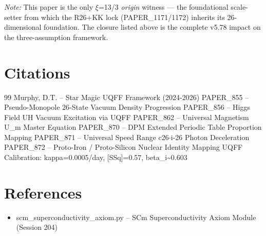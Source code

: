 \documentclass[12pt,a4paper]{article}
\begin{document}
\emph{Note:} This paper is the only $\xi$=13/3 \emph{origin} witness --- the foundational scale-setter from which the R26+KK lock (PAPER\_1171/1172) inherits its 26-dimensional foundation. The closure listed above is the complete v5.78 impact on the three-assumption framework.


\section*{Citations}
\begin{thebibliography}{99}
 Murphy, D.T. -- Star Magic UQFF Framework (2024-2026)
 PAPER\_855 -- Pseudo-Monopole 26-State Vacuum Density Progression
 PAPER\_856 -- Higgs Field UH Vacuum Excitation via UQFF
 PAPER\_862 -- Universal Magnetism U\_m Master Equation
 PAPER\_870 -- DPM Extended Periodic Table Proportion Mapping
 PAPER\_871 -- Universal Speed Range c26$\cdot$i-26 Photon Deceleration
 PAPER\_872 -- Proto-Iron / Proto-Silicon Nuclear Identity Mapping
 UQFF Calibration: kappa=0.0005/day, [SSq]=0.57, beta\_i\textasciitilde{}0.603
\end{thebibliography}

\section*{References}
\begin{itemize}
  \item[8.] scm\_{superconductivity\_axiom}.py -- SCm Superconductivity Axiom Module (Session 204)
\end{itemize}

\end{document}
